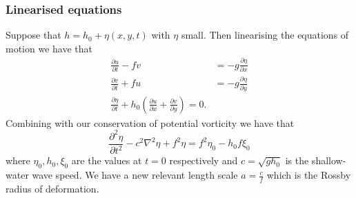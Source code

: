 \documentclass{article}
\begin{document}
\subsubsection{Linearised equations}
Suppose that $ h = h_0 + \eta(x,y,t) $ with $ \eta $ small. Then linearising the equations of motion we have that
\begin{align*}
	\frac{\partial u}{\partial t} - fv &= -g\frac{\partial \eta}{\partial x} \\
	\frac{\partial v}{\partial t} + fu &= -g\frac{\partial \eta}{\partial y} \\
	\frac{\partial \eta}{\partial t} + h_0 \left(\frac{\partial u}{\partial x}+ \frac{\partial v}{\partial y}\right) = 0.
\end{align*}
Combining with our conservation of potential vorticity we have that
\[
	\frac{\partial^2 \eta}{\partial t^2} - c^2 \nabla^2 \eta + f^2\eta  = f^2 \eta_0 - h_0 f\xi_0
\]
where $ \eta_0, h_0, \xi_0 $ are the values at $ t=0 $ respectively and $ c =\sqrt{gh_0} $ is the shallow-water wave speed. We have a new relevant length scale $ a = \frac cf $ which is the Rossby radius of deformation. 
\end{document}
